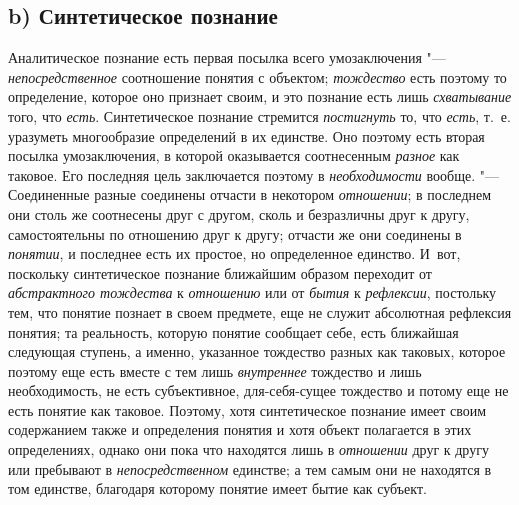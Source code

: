 {{\subsection[b) Синтетическое познание]{b) Синтетическое познание}
Аналитическое познание есть первая посылка всего
умозаключения "--- {\em непосредственное}
соотношение понятия с объектом;
{\em тождество} есть
поэтому то определение, которое оно признает своим, и это познание есть
лишь {\em схватывание}
того, что {\em есть}.
Синтетическое познание стремится
{\em постигнуть} то, что
{\em есть}, т.~е.
уразуметь многообразие определений в их единстве. Оно поэтому есть вторая
посылка умозаключения, в
которой
оказывается соотнесенным
{\em разное} как таковое.
Его последняя цель заключается поэтому в
{\em необходимости}
вообще. "--- Соединенные разные соединены отчасти
в некотором {\em отношении};
в последнем они столь же соотнесены друг с другом, сколь и
безразличны друг к другу, самостоятельны по отношению друг к другу; отчасти
же они соединены в {\em понятии},
и последнее есть их простое, но определенное единство. И~вот,
поскольку синтетическое познание ближайшим образом переходит от
{\em абстрактного тождества}
к {\em отношению}
или от {\em бытия}
к {\em рефлексии},
постольку тем, что понятие познает в своем предмете, еще не
служит абсолютная рефлексия понятия; та реальность, которую понятие
сообщает себе, есть ближайшая следующая ступень, а именно, указанное
тождество разных как таковых, которое поэтому еще есть вместе с тем лишь
{\em внутреннее}
тождество и лишь необходимость, не есть субъективное,
для-себя-сущее тождество и потому еще не есть понятие как таковое. Поэтому,
хотя синтетическое познание имеет своим содержанием также и определения
понятия и хотя объект полагается в этих определениях, однако они пока что
находятся лишь в {\em отношении}
друг к другу или пребывают в
{\em непосредственном}
единстве; а тем самым они не находятся в том единстве,
благодаря которому понятие имеет бытие как субъект.

}}
